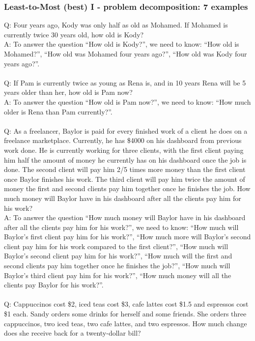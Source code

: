 \subsubsection{Least-to-Most (best) I - problem decomposition: 7 examples}

Q: Four years ago, Kody was only half as old as Mohamed. If Mohamed is currently twice 30 years old, how old is Kody? \\
A: To answer the question ``How old is Kody?'', we need to know: ``How old is Mohamed?'', ``How old was Mohamed four years ago?'', ``How old was Kody four years ago?''. \\
 \\
Q: If Pam is currently twice as young as Rena is, and in 10 years Rena will be 5 years older than her, how old is Pam now? \\
A: To answer the question ``How old is Pam now?'', we need to know: ``How much older is Rena than Pam currently?''. \\
 \\
Q: As a freelancer, Baylor is paid for every finished work of a client he does on a freelance marketplace. Currently, he has \$4000 on his dashboard from previous work done. He is currently working for three clients, with the first client paying him half the amount of money he currently has on his dashboard once the job is done. The second client will pay him 2/5 times more money than the first client once Baylor finishes his work. The third client will pay him twice the amount of money the first and second clients pay him together once he finishes the job. How much money will Baylor have in his dashboard after all the clients pay him for his work? \\
A: To answer the question ``How much money will Baylor have in his dashboard after all the clients pay him for his work?'', we need to know: ``How much will Baylor's first client pay him for his work?'', ``How much more will Baylor's second client pay him for his work compared to the first client?'', ``How much will Baylor's second client pay him for his work?'', ``How much will the first and second clients pay him together once he finishes the job?'', ``How much will Baylor's third client pay him for his work?'', ``How much money will all the clients pay Baylor for his work?''. \\
 \\
Q: Cappuccinos cost \$2, iced teas cost \$3, cafe lattes cost \$1.5 and espressos cost \$1 each. Sandy orders some drinks for herself and some friends. She orders three cappuccinos, two iced teas, two cafe lattes, and two espressos. How much change does she receive back for a twenty-dollar bill? \\
